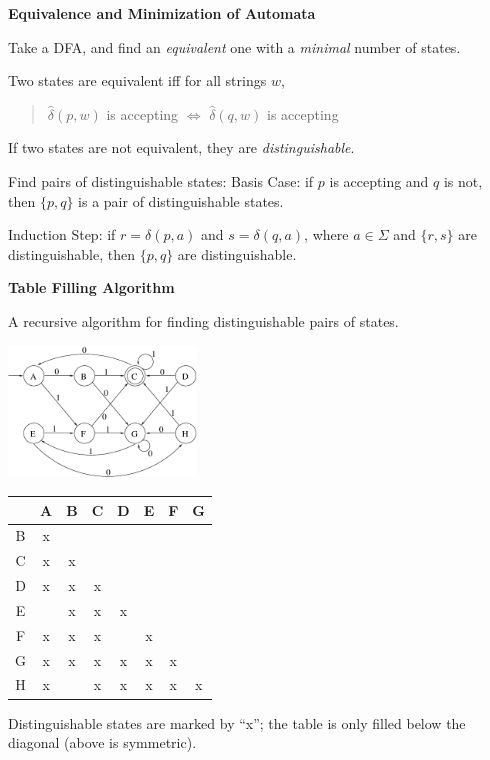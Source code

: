 \begin{frame}

{\bf Equivalence and Minimization of Automata}

Take a DFA, and find an {\em equivalent} one with a {\em minimal}
number of states.

Two states are equivalent iff for all strings $w$,
\begin{quote}
$\hat\delta(p,w)$ is accepting $\iff$ $\hat\delta(q,w)$ is accepting
\end{quote}
If two states are not equivalent, they are {\em distinguishable}.

Find pairs of distinguishable states: Basis Case: if $p$ is accepting
and $q$ is not, then $\{p,q\}$ is a pair of distinguishable states.

Induction Step: if $r=\delta(p,a)$ and $s=\delta(q,a)$, where
$a\in\Sigma$ and $\{r,s\}$ are distinguishable, then $\{p,q\}$ are
distinguishable.
\end{frame}

\begin{frame}

{\bf Table Filling Algorithm}

A recursive algorithm for finding distinguishable pairs of states.

\begin{minipage}{5cm}
\includegraphics[width=5cm]{figures/7.pdf}
\end{minipage}
\begin{minipage}{5cm}
\begin{tabular}{|c|ccccccc}\hline
  & A & B & C & D & E & F & G \\\hline
B & x &   &   &   &   &   &   \\
C & x & x &   &   &   &   &   \\
D & x & x & x &   &   &   &   \\
E &   & x & x & x &   &   &   \\
F & x & x & x &   & x &   &   \\
G & x & x & x & x & x & x &   \\
H & x &   & x & x & x & x & x
\end{tabular}
\end{minipage}

Distinguishable states are marked by ``x''; the table is only filled
below the diagonal (above is symmetric).
\end{frame}

